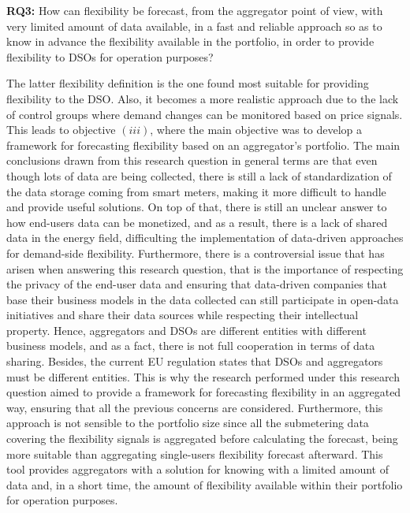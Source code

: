 \begin{tcolorbox}
\textbf{RQ3:} How can flexibility be forecast, from the aggregator point of view, with very limited amount of data available, in a fast and reliable approach so as to know in advance the flexibility available in the portfolio, in order to provide flexibility to DSOs for operation purposes?
\end{tcolorbox}

The latter flexibility definition is the one found most suitable for providing flexibility to the DSO. Also, it becomes a more realistic approach due to the lack of control groups where demand changes can be monitored based on price signals. This leads to objective $(iii)$, where the main objective was to develop a framework for forecasting flexibility based on an aggregator's portfolio. The main conclusions drawn from this research question in general terms are that even though lots of data are being collected, there is still a lack of standardization of the data storage coming from smart meters, making it more difficult to handle and provide useful solutions. On top of that, there is still an unclear answer to how end-users data can be monetized, and as a result, there is a lack of shared data in the energy field, difficulting the implementation of data-driven approaches for demand-side flexibility. Furthermore, there is a controversial issue that has arisen when answering this research question, that is the importance of respecting the privacy of the end-user data and ensuring that data-driven companies that base their business models in the data collected can still participate in open-data initiatives and share their data sources while respecting their intellectual property. Hence, aggregators and DSOs are different entities with different business models, and as a fact, there is not full cooperation in terms of data sharing. Besides, the current EU regulation states that DSOs and aggregators must be different entities. This is why the research performed under this research question aimed to provide a framework for forecasting flexibility in an aggregated way, ensuring that all the previous concerns are considered. Furthermore, this approach is not sensible to the portfolio size since all the submetering data covering the flexibility signals is aggregated before calculating the forecast, being more suitable than aggregating single-users flexibility forecast afterward. This tool provides aggregators with a solution for knowing with a limited amount of data and, in a short time, the amount of flexibility available within their portfolio for operation purposes. 

